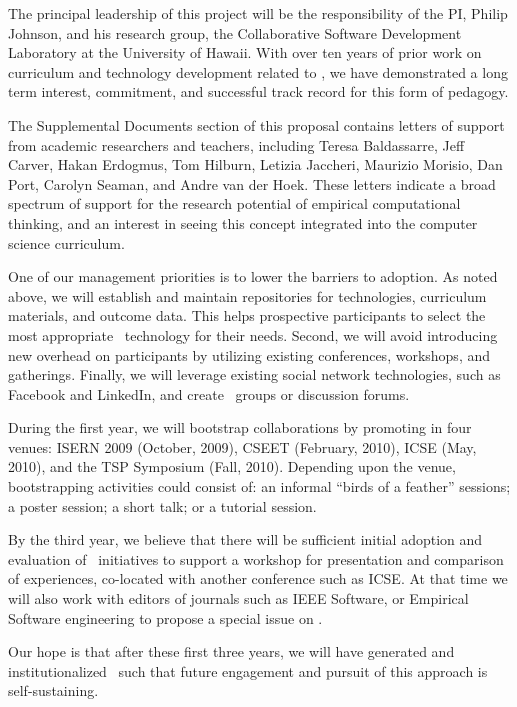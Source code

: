 The principal leadership of this project will be the responsibility of the
PI, Philip Johnson, and his research group, the Collaborative Software
Development Laboratory at the University of Hawaii.  With over ten years of
prior work on curriculum and technology development related to \eCT, we have
demonstrated a long term interest, commitment, and successful track record
for this form of pedagogy.

The Supplemental Documents section of this proposal contains letters of
support from academic researchers and teachers, including Teresa
Baldassarre, Jeff Carver, Hakan Erdogmus, Tom Hilburn, Letizia Jaccheri,
Maurizio Morisio, Dan Port, Carolyn Seaman, and Andre van der Hoek.  These
letters indicate a broad spectrum of support for the research potential of
empirical computational thinking, and an interest in seeing this concept
integrated into the computer science curriculum.

One of our management priorities is to lower the barriers to adoption.  As
noted above, we will establish and maintain repositories for technologies,
curriculum materials, and outcome data.  This helps prospective
participants to select the most appropriate \eCT\ technology for their
needs.  Second, we will avoid introducing new overhead on participants by
utilizing existing conferences, workshops, and gatherings.  Finally, we
will leverage existing social network technologies, such as Facebook and
LinkedIn, and create \eCT\ groups or discussion forums.

During the first year, we will bootstrap collaborations by promoting \eCT
in four venues: ISERN 2009 (October, 2009), CSEET (February, 2010), ICSE
(May, 2010), and the TSP Symposium (Fall, 2010). Depending upon the venue,
bootstrapping activities could consist of: an informal ``birds of a
feather'' sessions; a poster session; a short talk; or a tutorial session.  

By the third year, we believe that there will be sufficient
initial adoption and evaluation of \eCT\ initiatives to support a workshop
for presentation and comparison of experiences, co-located with another
conference such as ICSE.  At that time we will also work with editors of
journals such as IEEE Software, or Empirical Software engineering to
propose a special issue on \eCT.

Our hope is that after these first three years, we will have generated and 
institutionalized \eCT\ such that future engagement and pursuit of this 
approach is self-sustaining. 

